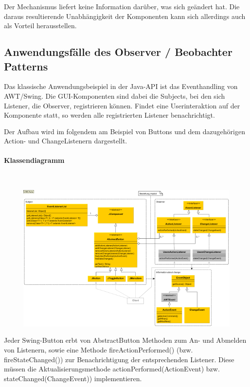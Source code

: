 		Der Mechanismus liefert keine Information darüber, was sich geändert hat. Die daraus resultierende Unabhängigkeit der Komponenten kann sich allerdings auch als Vorteil herausstellen.
	
\clearpage

	
	\subsection{Anwendungsfälle des Observer / Beobachter Patterns}
	Das klassische Anwendungsbeispiel in der Java-API ist das Eventhandling von AWT/Swing. Die GUI-Komponenten sind dabei die Subjects, bei den sich Listener, die Observer, registrieren können. Findet eine Userinteraktion auf der Komponente statt, so werden alle registrierten Listener benachrichtigt.
	
	Der Aufbau wird im folgendem am Beispiel von Buttons und dem dazugehörigen Action- und ChangeListenern dargestellt.
	
	\paragraph{Klassendiagramm \cite{obss}}\mbox{}\\
	\begin{figure}[!h]
		\begin{center}
			\includegraphics[width=0.9\linewidth]{images/api-eventhandling.png}
		\end{center}
	\end{figure}
	
	Jeder Swing-Button erbt von AbstractButton Methoden zum An- und Abmelden von Listenern, sowie eine Methode fireActionPerformed() (bzw. fireStateChanged()) zur Benachrichtigung der entsprechenden Listener. Diese müssen die Aktualisierungsmethode actionPerformed(ActionEvent) bzw. stateChanged(ChangeEvent)) implementieren.
\clearpage
